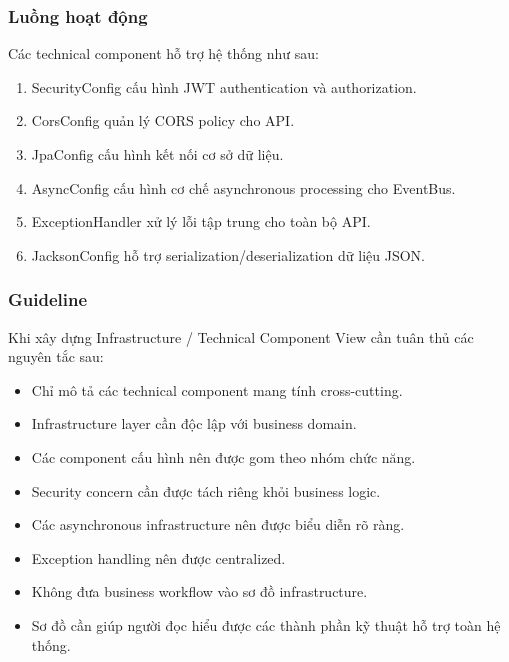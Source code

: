 \subsubsection*{Luồng hoạt động}

Các technical component hỗ trợ hệ thống như sau:

\begin{enumerate}
    \item SecurityConfig cấu hình JWT authentication và authorization.
    
    \item CorsConfig quản lý CORS policy cho API.
    
    \item JpaConfig cấu hình kết nối cơ sở dữ liệu.
    
    \item AsyncConfig cấu hình cơ chế asynchronous processing cho EventBus.
    
    \item ExceptionHandler xử lý lỗi tập trung cho toàn bộ API.
    
    \item JacksonConfig hỗ trợ serialization/deserialization dữ liệu JSON.
\end{enumerate}

\subsubsection*{Guideline}

Khi xây dựng Infrastructure / Technical Component View cần tuân thủ các nguyên tắc sau:

\begin{itemize}
    \item Chỉ mô tả các technical component mang tính cross-cutting.
    
    \item Infrastructure layer cần độc lập với business domain.
    
    \item Các component cấu hình nên được gom theo nhóm chức năng.
    
    \item Security concern cần được tách riêng khỏi business logic.
    
    \item Các asynchronous infrastructure nên được biểu diễn rõ ràng.
    
    \item Exception handling nên được centralized.
    
    \item Không đưa business workflow vào sơ đồ infrastructure.
    
    \item Sơ đồ cần giúp người đọc hiểu được các thành phần kỹ thuật hỗ trợ toàn hệ thống.
\end{itemize}

